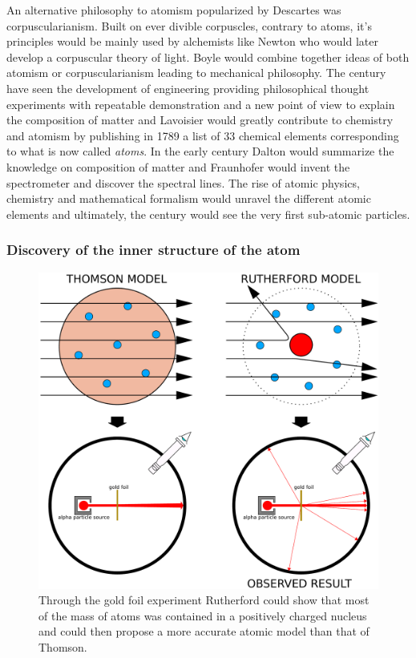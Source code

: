 	An alternative philosophy to atomism popularized by Descartes was corpuscularianism. Built on ever divible corpuscles, contrary to atoms, it's principles would be mainly used by alchemists like Newton who would later develop a corpuscular theory of light. Boyle would combine together ideas of both atomism or corpuscularianism leading to mechanical philosophy. The  century have seen the development of engineering providing philosophical thought experiments with repeatable demonstration and a new point of view to explain the composition of matter and Lavoisier would greatly contribute to chemistry and atomism by publishing in 1789 a list of 33 chemical elements corresponding to what is now called \textit{atoms}. In the early  century Dalton would summarize the knowledge on composition of matter and Fraunhofer would invent the spectrometer and discover the spectral lines. The rise of atomic physics, chemistry and mathematical formalism would unravel the different atomic elements and ultimately, the  century would see the very first sub-atomic particles.
	
	\subsubsection*{Discovery of the inner structure of the atom}
	\label{chapt2:sssec:atomstructure}

	\begin{figure}[H]
		\centering
		\includegraphics[width=0.7\linewidth]{fig/chapt2/Thomson_Rutherford_atoms.pdf}
		\caption{\label{fig:Atom_models} Through the gold foil experiment Rutherford could show that most of the mass of atoms was contained in a positively charged nucleus and could then propose a more accurate atomic model than that of Thomson.}
	\end{figure}
	
